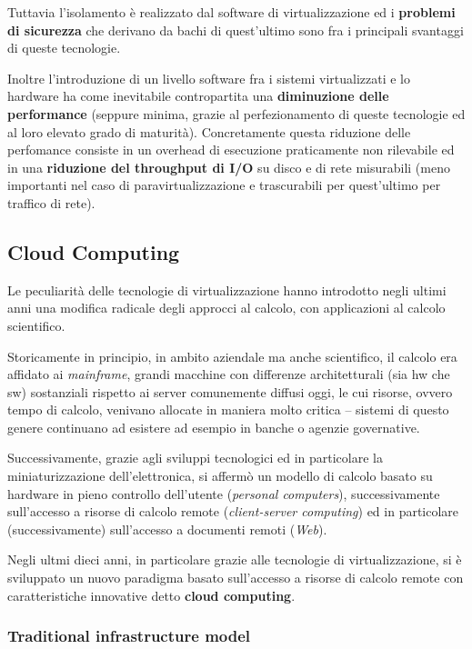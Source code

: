 Tuttavia l'isolamento è realizzato dal software di virtualizzazione ed i
\textbf{problemi di sicurezza} che derivano da bachi di quest'ultimo
sono fra i principali svantaggi di queste tecnologie.

Inoltre l'introduzione di un livello software fra i sistemi
virtualizzati e lo hardware ha come inevitabile contropartita una
\textbf{diminuzione delle performance} (seppure minima, grazie al
perfezionamento di queste tecnologie ed al loro elevato grado di
maturità). Concretamente questa riduzione delle perfomance consiste in
un overhead di esecuzione praticamente non rilevabile ed in una
\textbf{riduzione del throughput di I/O} su disco e di rete misurabili
(meno importanti nel caso di paravirtualizzazione e trascurabili per
quest'ultimo per traffico di rete).

\subsection{Cloud Computing}\label{cloud-computing}

Le peculiarità delle tecnologie di virtualizzazione hanno introdotto
negli ultimi anni una modifica radicale degli approcci al calcolo, con
applicazioni al calcolo scientifico.

Storicamente in principio, in ambito aziendale ma anche scientifico, il
calcolo era affidato ai \emph{mainframe}, grandi macchine con differenze
architetturali (sia hw che sw) sostanziali rispetto ai server
comunemente diffusi oggi, le cui risorse, ovvero tempo di calcolo,
venivano allocate in maniera molto critica -- sistemi di questo genere
continuano ad esistere ad esempio in banche o agenzie governative.

Successivamente, grazie agli sviluppi tecnologici ed in particolare la
miniaturizzazione dell'elettronica, si affermò un modello di calcolo
basato su hardware in pieno controllo dell'utente (\emph{personal
computers}), successivamente sull'accesso a risorse di calcolo remote
(\emph{client-server computing}) ed in particolare (successivamente)
sull'accesso a documenti remoti (\emph{Web}).

Negli ultmi dieci anni, in particolare grazie alle tecnologie di
virtualizzazione, si è sviluppato un nuovo paradigma basato sull'accesso
a risorse di calcolo remote con caratteristiche innovative detto
\textbf{cloud computing}.

\subsubsection{Traditional infrastructure
model}\label{traditional-infrastructure-model}

